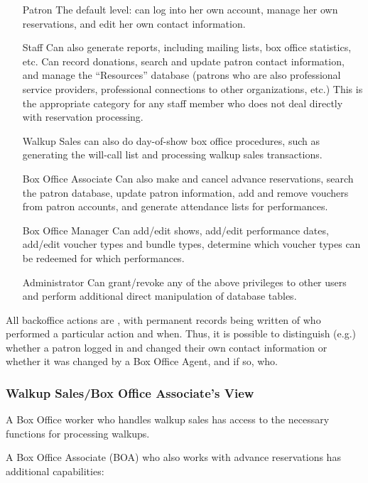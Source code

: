 \begin{enumerate}
\item[Patron] The default level: can log into her own account, manage
  her own reservations, and edit her own contact information.
\item[Staff] Can also generate reports, including mailing lists, box
  office statistics, etc.  Can record
  donations, search and update patron contact information, and manage
  the ``Resources'' database (patrons who are also professional service
  providers, professional connections to other organizations, etc.) This
  is the appropriate category for any 
  staff member who does not deal directly with reservation processing.
\item[Walkup Sales] can also do day-of-show box office procedures, such
  as generating the will-call list and processing walkup sales
  transactions.
\item[Box Office Associate] Can also make and cancel advance
  reservations, search the patron database, update patron information,
  add and remove vouchers from patron accounts, and generate attendance lists for performances.
\item[Box Office Manager] Can add/edit shows, add/edit performance dates,
  add/edit voucher types and bundle types, determine which voucher types
  can be redeemed for which performances.
\item[Administrator] Can grant/revoke any of the above privileges to
  other users and perform additional direct manipulation of database tables.
\end{enumerate}

All backoffice actions are , with
permanent records being written of who performed a particular action and
when.  Thus, it is possible to distinguish (e.g.)  whether a patron
logged in and changed their own contact information or whether it was
changed by a Box Office Agent, and if so, who.

\subsubsection{Walkup Sales/Box Office Associate's View}

A Box Office worker who handles walkup sales has access to the necessary
functions for processing walkups.

A Box Office Associate (BOA) who also works with advance reservations
has additional capabilities:


